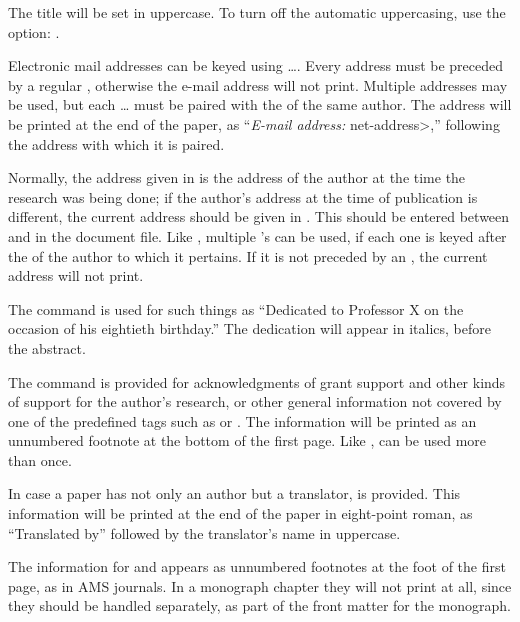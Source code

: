 The title will be set in uppercase.  To turn off the automatic
uppercasing, use the  option:
.

Electronic mail addresses can be keyed using \dots{}.
Every  address must be preceded by a regular ,
otherwise the e-mail address will not print.
Multiple  addresses may be used, but each
\dots{} must be paired with the 
of the same author.  The  address will be printed at the end
of the paper, as ``{\it E-mail address:\/} \<net-address>,'' following
the address with which it is paired.

Normally, the address given in  is 
the address of the author at the time the research
was being done; if the author's address at the time of
publication is different, the current address should be
given in .  This should be entered between
 and  in the document file.
Like , multiple 's can be used, if
each one is keyed after the  of the author to which it
pertains.  If it is not preceded by an , the
current address will not print.

The  command is used for such things as
``Dedicated to Professor X on the occasion of his eightieth birthday.''
The dedication will appear in italics, before the abstract.

The  command is provided for acknowledgments of grant support
and other kinds of support for the author's research, or other general
information not covered by one of the predefined tags such as
 or . The information will be printed as an
unnumbered footnote at the bottom of the first page.  Like ,
 can be used more than once.

In case a paper has not only an author but a translator, 
is provided.  This information will be printed at the end of the paper in
eight-point roman, as ``Translated by'' followed by the translator's name
in uppercase.

The information for  and  appears as
unnumbered footnotes at the foot of the first page, as in AMS journals.
In a monograph chapter they will not print at all, since they should be
handled separately, as part of the front matter for the monograph.

